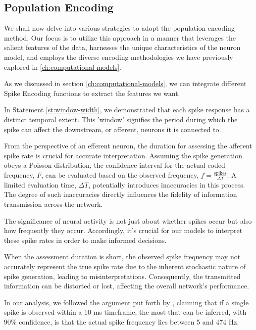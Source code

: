 \subsection{Population Encoding}

We shall now delve into various strategies to adopt the population encoding method. Our focus is to utilize this approach in a manner that leverages the salient features of the data, harnesses the unique characteristics of the neuron model, and employs the diverse encoding methodologies we have previously explored in \ref{ch:computational-models}.

As we discussed in section \ref{ch:computational-models}, we can integrate different Spike Encoding functions to extract the features we want.

In Statement \ref{st:window-width}, we demonstrated that each spike response has a distinct temporal extent. This 'window' signifies the period during which the spike can affect the downstream, or afferent, neurons it is connected to.

From the perspective of an efferent neuron, the duration for assessing the afferent spike rate is crucial for accurate interpretation. Assuming the spike generation obeys a Poisson distribution, the confidence interval for the actual coded frequency, $F$, can be evaluated based on the observed frequency, $f = \frac{\text{spikes}}{\Delta T}$. A limited evaluation time, $\Delta T$, potentially introduces inaccuracies in this process. The degree of such inaccuracies directly influences the fidelity of information transmission across the network.

The significance of neural activity is not just about whether spikes occur but also how frequently they occur. Accordingly, it's crucial for our models to interpret these spike rates in order to make informed decisions.

When the assessment duration is short, the observed spike frequency may not accurately represent the true spike rate due to the inherent stochastic nature of spike generation, leading to misinterpretations. Consequently, the transmitted information can be distorted or lost, affecting the overall network's performance.

In our analysis, we followed the argument put forth by \cite{gautrais1998rate}, claiming that if a single spike is observed within a 10 ms timeframe, the most that can be inferred, with 90\% confidence, is that the actual spike frequency lies between 5 and 474 Hz.

